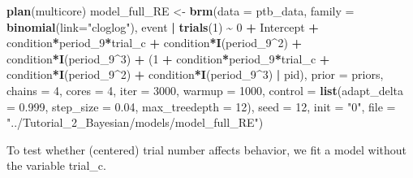 \documentclass[
  man,floatsintext]{apa6}
\newenvironment{Shaded}{\begin{snugshade}}{\end{snugshade}}
\newcommand{\AttributeTok}[1]{\textcolor[rgb]{0.13,0.29,0.53}{#1}}
\newcommand{\DecValTok}[1]{\textcolor[rgb]{0.00,0.00,0.81}{#1}}
\newcommand{\FloatTok}[1]{\textcolor[rgb]{0.00,0.00,0.81}{#1}}
\newcommand{\FunctionTok}[1]{\textcolor[rgb]{0.13,0.29,0.53}{\textbf{#1}}}
\newcommand{\NormalTok}[1]{#1}
\newcommand{\OtherTok}[1]{\textcolor[rgb]{0.56,0.35,0.01}{#1}}
\newcommand{\SpecialCharTok}[1]{\textcolor[rgb]{0.81,0.36,0.00}{\textbf{#1}}}
\newcommand{\StringTok}[1]{\textcolor[rgb]{0.31,0.60,0.02}{#1}}
\begin{document}
\begin{Shaded}
\begin{Highlighting}[]
\FunctionTok{plan}\NormalTok{(multicore)}
\NormalTok{model\_full\_RE }\OtherTok{\textless{}{-}}
   \FunctionTok{brm}\NormalTok{(}\AttributeTok{data =}\NormalTok{ ptb\_data,}
       \AttributeTok{family =} \FunctionTok{binomial}\NormalTok{(}\AttributeTok{link=}\StringTok{"cloglog"}\NormalTok{),}
\NormalTok{       event }\SpecialCharTok{|} \FunctionTok{trials}\NormalTok{(}\DecValTok{1}\NormalTok{) }\SpecialCharTok{\textasciitilde{}} \DecValTok{0} \SpecialCharTok{+}\NormalTok{ Intercept }\SpecialCharTok{+} 
\NormalTok{                           condition}\SpecialCharTok{*}\NormalTok{period\_9}\SpecialCharTok{*}\NormalTok{trial\_c }\SpecialCharTok{+} 
\NormalTok{                           condition}\SpecialCharTok{*}\FunctionTok{I}\NormalTok{(period\_9}\SpecialCharTok{\^{}}\DecValTok{2}\NormalTok{) }\SpecialCharTok{+} 
\NormalTok{                           condition}\SpecialCharTok{*}\FunctionTok{I}\NormalTok{(period\_9}\SpecialCharTok{\^{}}\DecValTok{3}\NormalTok{) }\SpecialCharTok{+}
\NormalTok{                           (}\DecValTok{1} \SpecialCharTok{+}\NormalTok{ condition}\SpecialCharTok{*}\NormalTok{period\_9}\SpecialCharTok{*}\NormalTok{trial\_c }\SpecialCharTok{+}
\NormalTok{                           condition}\SpecialCharTok{*}\FunctionTok{I}\NormalTok{(period\_9}\SpecialCharTok{\^{}}\DecValTok{2}\NormalTok{) }\SpecialCharTok{+}
\NormalTok{                           condition}\SpecialCharTok{*}\FunctionTok{I}\NormalTok{(period\_9}\SpecialCharTok{\^{}}\DecValTok{3}\NormalTok{) }\SpecialCharTok{|}\NormalTok{ pid),}
       \AttributeTok{prior =}\NormalTok{ priors,}
       \AttributeTok{chains =} \DecValTok{4}\NormalTok{, }\AttributeTok{cores =} \DecValTok{4}\NormalTok{, }\AttributeTok{iter =} \DecValTok{3000}\NormalTok{, }\AttributeTok{warmup =} \DecValTok{1000}\NormalTok{,}
       \AttributeTok{control =} \FunctionTok{list}\NormalTok{(}\AttributeTok{adapt\_delta =} \FloatTok{0.999}\NormalTok{, }\AttributeTok{step\_size =} \FloatTok{0.04}\NormalTok{, }\AttributeTok{max\_treedepth =} \DecValTok{12}\NormalTok{),}
       \AttributeTok{seed =} \DecValTok{12}\NormalTok{, }\AttributeTok{init =} \StringTok{"0"}\NormalTok{,}
       \AttributeTok{file =} \StringTok{"../Tutorial\_2\_Bayesian/models/model\_full\_RE"}\NormalTok{)}
\end{Highlighting}
\end{Shaded}

\normalsize

To test whether (centered) trial number affects behavior, we fit a model without the variable trial\_c.
\end{document}
